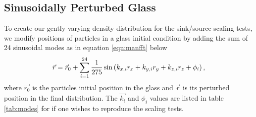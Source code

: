 \documentclass[fleq,usenatbib]{mnras}
\begin{document}
\subsection{Sinusoidally Perturbed Glass}
To create our gently varying density distribution for the sink/source scaling 
tests, we modify positions of particles in a glass initial condition by adding 
the sum of 24 sinusoidal modes as in equation \ref{eqn:manfft} below
\begin{equation}\label{eqn:manfft}
\vec{r} = \vec{r}_{\rm 0} + \sum_{i=1}^{24} \frac{1}{275} \sin 
\left( k_{x,i} r_x + k_{y,i} r_y + k_{z,i} r_z + \phi_i\right),
\end{equation}
where $\vec{r_0}$ is the particles initial position in the glass and $\vec{r}$ 
is its perturbed position in the final distribution. The $\vec{k_i}$ and 
$\phi_i$ values are listed in table \ref{tab:modes} for if one wishes to 
reproduce the scaling tests.  
\end{document}
